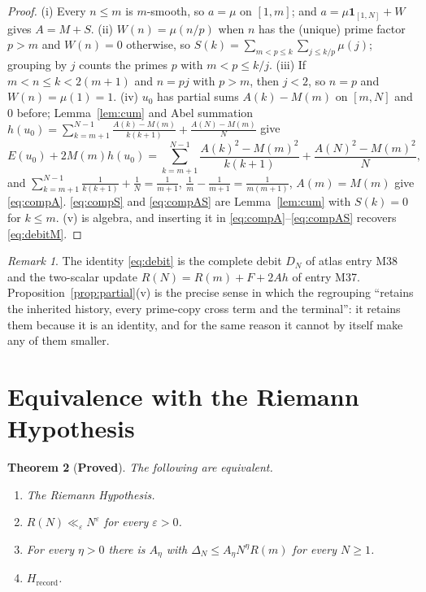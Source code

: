 \documentclass[11pt]{article}
\newtheorem{theorem}{Theorem}[section]
\theoremstyle{definition}
\theoremstyle{remark}
\newtheorem{remark}[theorem]{Remark}
\newcommand{\Hrec}{H_{\mathrm{record}}}
\begin{document}
\begin{proof}
(i) Every $n\le m$ is $m$-smooth, so $a=\mu$ on $[1,m]$; and $a=\mu\mathbf 1_{[1,N]}+W$ gives $A=M+S$. (ii) $W(n)=\mu(n/p)$ when $n$ has the (unique) prime factor $p>m$ and $W(n)=0$ otherwise, so $S(k)=\sum_{m<p\le k}\sum_{j\le k/p}\mu(j)$; grouping by $j$ counts the primes $p$ with $m<p\le k/j$. (iii) If $m<n\le k<2(m+1)$ and $n=pj$ with $p>m$, then $j<2$, so $n=p$ and $W(n)=\mu(1)=1$. (iv) $u_0$ has partial sums $A(k)-M(m)$ on $[m,N]$ and $0$ before; Lemma~\ref{lem:cum} and Abel summation $h(u_0)=\sum_{k=m+1}^{N-1}\frac{A(k)-M(m)}{k(k+1)}+\frac{A(N)-M(m)}N$ give
\[
E(u_0)+2M(m)h(u_0)=\sum_{k=m+1}^{N-1}\frac{A(k)^2-M(m)^2}{k(k+1)}+\frac{A(N)^2-M(m)^2}N ,
\]
and $\sum_{k=m+1}^{N-1}\frac1{k(k+1)}+\frac1N=\frac1{m+1}$, $\frac1m-\frac1{m+1}=\frac1{m(m+1)}$, $A(m)=M(m)$ give \eqref{eq:compA}. \eqref{eq:compS} and \eqref{eq:compAS} are Lemma~\ref{lem:cum} with $S(k)=0$ for $k\le m$. (v) is algebra, and inserting it in \eqref{eq:compA}--\eqref{eq:compAS} recovers \eqref{eq:debitM}.
\end{proof}

\begin{remark}
The identity \eqref{eq:debit} is the complete debit $D_N$ of atlas entry M38 and the two-scalar update $R(N)=R(m)+F+2Ah$ of entry M37. Proposition~\ref{prop:partial}(v) is the precise sense in which the regrouping ``retains the inherited history, every prime-copy cross term and the terminal'': it retains them because it is an identity, and for the same reason it cannot by itself make any of them smaller.
\end{remark}

\section{Equivalence with the Riemann Hypothesis}\label{sec:equiv}

\begin{theorem}[\textbf{Proved}]\label{thm:equiv}
The following are equivalent.
\begin{enumerate}
\item[(i)] The Riemann Hypothesis.
\item[(ii)] $R(N)\ll_\varepsilon N^\varepsilon$ for every $\varepsilon>0$.
\item[(iii)] For every $\eta>0$ there is $A_\eta$ with $\Delta_N\le A_\eta N^\eta R(m)$ for every $N\ge1$.
\item[(iv)] $\Hrec$.
\end{enumerate}
\end{theorem}
\end{document}
